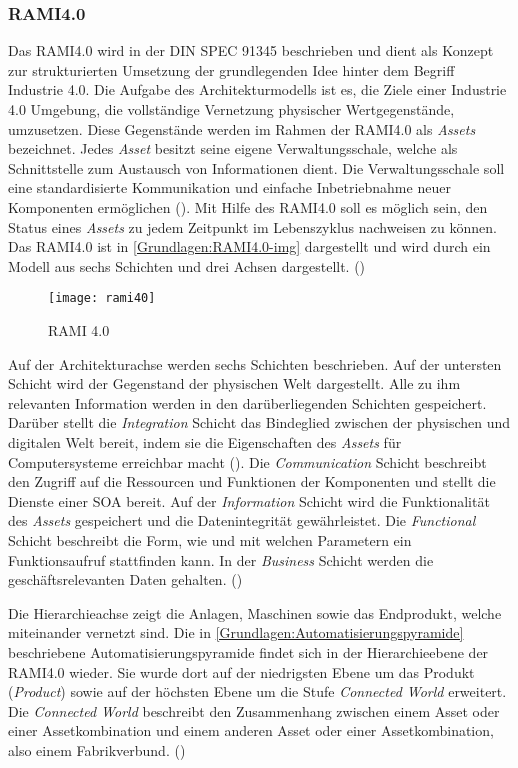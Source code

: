 \subsubsection{\ac{RAMI4.0}}
\label{Grundlagen:RAMI4.0}
Das \ac{RAMI4.0} wird in der DIN SPEC 91345 beschrieben und dient als Konzept zur strukturierten Umsetzung der grundlegenden Idee hinter dem Begriff Industrie 4.0. Die Aufgabe des Architekturmodells ist es, die Ziele einer Industrie 4.0 Umgebung, die vollständige Vernetzung physischer Wertgegenstände, umzusetzen. Diese Gegenstände werden im Rahmen der \ac{RAMI4.0} als \textit{Assets} bezeichnet. Jedes \textit{Asset} besitzt seine eigene Verwaltungsschale, welche als Schnittstelle zum Austausch von Informationen dient. Die Verwaltungsschale soll eine standardisierte Kommunikation und einfache Inbetriebnahme neuer Komponenten ermöglichen (\cite{rami2016}). Mit Hilfe des \ac{RAMI4.0} soll es möglich sein, den Status eines \textit{Assets} zu jedem Zeitpunkt im Lebenszyklus nachweisen zu können. Das \ac{RAMI4.0} ist in \autoref{Grundlagen:RAMI4.0-img} dargestellt und wird durch ein Modell aus sechs Schichten und drei Achsen dargestellt. (\cite{RAMISpec})

\begin{figure}[h]
  \centering
  \texttt{[image: rami40]}
  \caption{RAMI 4.0}
  \label{Grundlagen:RAMI4.0-img}
\end{figure}

Auf der Architekturachse werden sechs Schichten beschrieben. Auf der untersten Schicht wird der Gegenstand der physischen Welt dargestellt. Alle zu ihm relevanten Information werden in den darüberliegenden Schichten gespeichert. Darüber stellt die \textit{Integration} Schicht das Bindeglied zwischen der physischen und digitalen Welt bereit, indem sie die Eigenschaften des \textit{Assets} für Computersysteme erreichbar macht (\cite{BMWiNeCon2016}). Die \textit{Communication} Schicht beschreibt den Zugriff auf die Ressourcen und Funktionen der Komponenten und stellt die Dienste einer \ac{SOA} bereit. Auf der \textit{Information} Schicht wird die Funktionalität des \textit{Assets} gespeichert und die Datenintegrität gewährleistet. Die \textit{Functional} Schicht beschreibt die Form, wie und mit welchen Parametern ein Funktionsaufruf stattfinden kann. In der \textit{Business} Schicht werden die geschäftsrelevanten Daten gehalten. (\cite{RAMISpec})

Die Hierarchieachse zeigt die Anlagen, Maschinen sowie das Endprodukt, welche miteinander vernetzt sind. Die in \autoref{Grundlagen:Automatisierungspyramide} beschriebene Automatisierungspyramide findet sich in der Hierarchieebene der \ac{RAMI4.0} wieder. Sie wurde dort auf der niedrigsten Ebene um das Produkt (\textit{Product}) sowie auf der höchsten Ebene um die Stufe \textit{Connected World} erweitert. Die \textit{Connected World} beschreibt den Zusammenhang zwischen einem Asset oder einer Assetkombination und einem anderen Asset oder einer Assetkombination, also einem Fabrikverbund. (\cite{RAMISpec})


